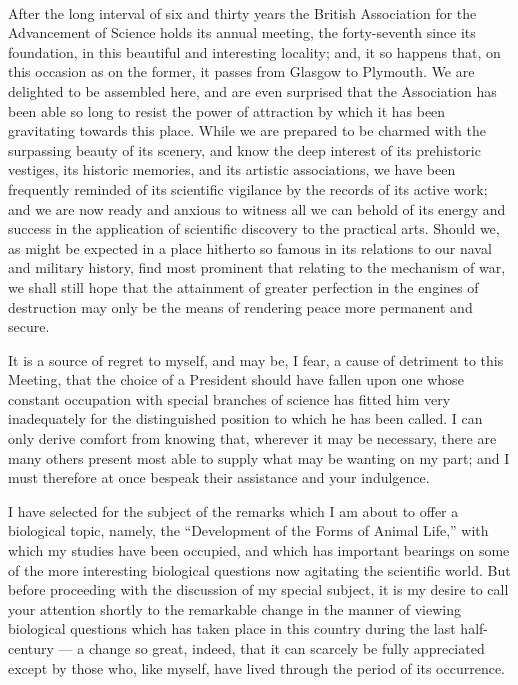 \documentclass[a4paper, 11pt, oneside, english]{article}
\begin{document}
\paragraph{}
After the long interval of six and thirty years the British Association for the Advancement of Science holds its annual meeting, the forty-seventh since its foundation, in this beautiful and interesting locality; and, it so happens that, on this occasion as on the former, it passes from Glasgow to Plymouth. We are delighted to be assembled here, and are even surprised that the Association has been able so long to resist the power of attraction by which it has been gravitating towards this place. While we are prepared to be charmed with the surpassing beauty of its scenery, and know the deep interest of its prehistoric vestiges, its historic memories, and its artistic associations, we have been frequently reminded of its scientific vigilance by the records of its active work; and we are now ready and anxious to witness all we can behold of its energy and success in the application of scientific discovery to the practical arts. Should we, as might be expected in a place hitherto so famous in its relations to our naval and military history, find most prominent that relating to the mechanism of war, we shall still hope that the attainment of greater perfection in the engines of destruction may only be the means of rendering peace more permanent and secure.

It is a source of regret to myself, and may be, I fear, a cause of detriment to this Meeting, that the choice of a President should have fallen upon one whose constant occupation with special branches of science has fitted him very inadequately for the distinguished position to which he has been called. I can only derive comfort from knowing that, wherever it may be necessary, there are many others present most able to supply what may be wanting on my part; and I must therefore at once bespeak their assistance and your indulgence.

I have selected for the subject of the remarks which I am about to offer a biological topic, namely, the ``Development of the Forms of Animal Life,'' with which my studies have been occupied, and which has important bearings on some of the more interesting biological questions now agitating the scientific world. But before proceeding with the discussion of my special subject, it is my desire to call your attention shortly to the remarkable change in the manner of viewing biological questions which has taken place in this country during the last half-century --- a change so great, indeed, that it can scarcely be fully appreciated except by those who, like myself, have lived through the period of its occurrence.
\end{document}
